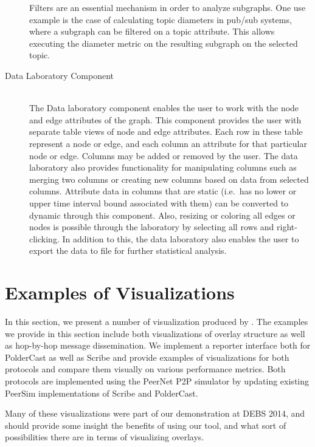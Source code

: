 \begin{description}
    Filters are an essential mechanism in order to analyze subgraphs.
    One use example is the case of calculating topic diameters in pub/sub systems,
    where a subgraph can be filtered on a topic attribute. This
    allows executing the diameter metric on the resulting subgraph
    on the selected topic.

\item[Data Laboratory Component] \hfill \\

    The Data laboratory component enables the user to work with the node
    and edge attributes of the graph. This component provides the user
    with separate table views of node and edge attributes. Each row in
    these table represent a node or edge, and each column an attribute
    for that particular node or edge. Columns may be added or removed by
    the user. The data laboratory also provides functionality for
    manipulating columns such as merging two columns or creating new
    columns based on data from selected columns. Attribute data in
    columns that are static (i.e.\ has no lower or upper time interval
    bound associated with them) can be converted to dynamic through this
    component. Also, resizing or coloring all edges or nodes is possible
    through the laboratory by selecting all rows and right-clicking. In
    addition to this, the data laboratory also enables the user to export the
    data to file for further statistical analysis.

\end{description}

\section{Examples of Visualizations}

In this section, we present a number of visualization produced by \demo.
The examples we provide in this section include both visualizations of
overlay structure as well as hop-by-hop message dissemination.  We
implement a reporter interface both for PolderCast as well as Scribe and
provide examples of visualizations for both protocols and compare them
visually on various performance metrics. Both protocols are implemented
using the PeerNet P2P simulator by updating existing PeerSim
implementations of Scribe and PolderCast.

Many of these visualizations were part of our demonstration at
DEBS 2014, and should provide some insight the benefits of using
our tool, and what sort of possibilities there are in terms of
visualizing overlays.

